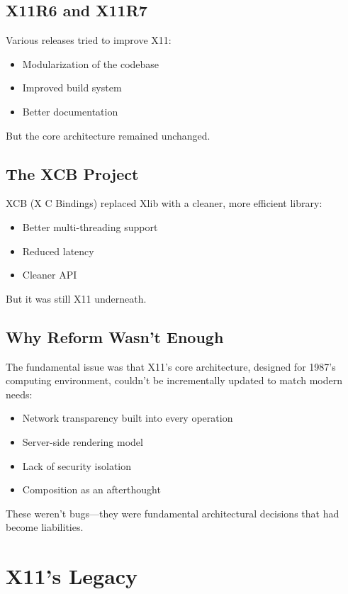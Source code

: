 \subsection{X11R6 and X11R7}

Various releases tried to improve X11:
\begin{itemize}[leftmargin=*]
    \item Modularization of the codebase
    \item Improved build system
    \item Better documentation
\end{itemize}

But the core architecture remained unchanged.

\subsection{The XCB Project}

XCB (X C Bindings) replaced Xlib with a cleaner, more efficient library:
\begin{itemize}[leftmargin=*]
    \item Better multi-threading support
    \item Reduced latency
    \item Cleaner API
\end{itemize}

But it was still X11 underneath.

\subsection{Why Reform Wasn't Enough}

The fundamental issue was that X11's core architecture, designed for 1987's computing environment, couldn't be incrementally updated to match modern needs:

\begin{itemize}[leftmargin=*]
    \item Network transparency built into every operation
    \item Server-side rendering model
    \item Lack of security isolation
    \item Composition as an afterthought
\end{itemize}

These weren't bugs—they were fundamental architectural decisions that had become liabilities.

\section{X11's Legacy}

